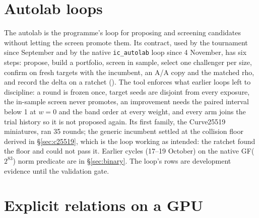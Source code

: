 \section{Autolab loops}\label{sec:in-autolab}

The autolab is the programme's loop for proposing and screening candidates
without letting the screen promote them. Its contract, used by the
tournament since September and by the native \texttt{ic\_autolab} loop since
4 November, has six steps: propose, build a portfolio, screen in sample,
select one challenger per size, confirm on fresh targets with the incumbent,
an A/A copy and the matched rho, and record the delta on a ratchet
(). The tool enforces what earlier
loops left to discipline: a round is frozen once, target seeds are disjoint
from every exposure, the in-sample screen never promotes, an improvement
needs the paired interval below 1 at $w=0$ and the band order at every
weight, and every arm joins the trial history so it is not proposed again.
Its first family, the Curve25519 miniatures, ran 35 rounds; the generic
incumbent settled at the collision floor derived in \S\ref{sec:c25519}, which
is the loop working as intended: the ratchet found the floor and could not
pass it. Earlier cycles (17--19 October) on the native GF($2^{83}$) norm
predicate are in \S\ref{sec:binary}. The loop's rows are development evidence
until the validation gate.

\section{Explicit relations on a GPU}\label{sec:in-gpu}

